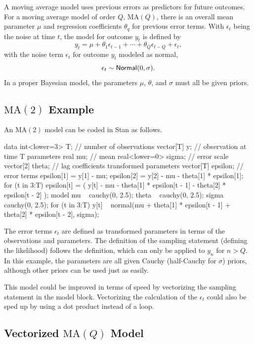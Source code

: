A moving average model uses previous errors as predictors for future
outcomes.  For a moving average model of order $Q$, $\mbox{MA}(Q)$,
there is an overall mean parameter $\mu$ and regression coefficients
$\theta_q$ for previous error terms.  With $\epsilon_t$ being the
noise at time $t$, the model for outcome $y_t$ is defined by
\[
y_t = \mu + \theta_1 \epsilon_{t-1} + \cdots + \theta_Q \epsilon_{t-Q}
+ \epsilon_t,
\]
with the noise term $\epsilon_t$ for outcome $y_t$ modeled as
normal,
\[
\epsilon_t \sim \distro{Normal}(0,\sigma).
\]
In a proper Bayesian model, the parameters $\mu$, $\theta$, and
$\sigma$ must all be given priors.

\subsection{$\mbox{MA}(2)$ Example}

An $\mbox{MA}(2)$ model can be coded in Stan as follows.
%
\begin{stancode}
data {
  int<lower=3> T;  // number of observations
  vector[T] y;     // observation at time T
}
parameters {
  real mu;              // mean
  real<lower=0> sigma;  // error scale
  vector[2] theta;      // lag coefficients
}
transformed parameters {
  vector[T] epsilon;    // error terms
  epsilon[1] = y[1] - mu;
  epsilon[2] = y[2] - mu - theta[1] * epsilon[1];
  for (t in 3:T)
    epsilon[t] = ( y[t] - mu
                    - theta[1] * epsilon[t - 1]
                    - theta[2] * epsilon[t - 2] );
}
model {
  mu ~ cauchy(0, 2.5);
  theta ~ cauchy(0, 2.5);
  sigma ~ cauchy(0, 2.5);
  for (t in 3:T)
    y[t] ~ normal(mu 
                  + theta[1] * epsilon[t - 1]
                  + theta[2] * epsilon[t - 2],
                  sigma);
}
\end{stancode}
%
The error terms $\epsilon_t$ are defined as transformed parameters in
terms of the observations and parameters.  The definition of the
sampling statement (defining the likelihood) follows the definition,
which can only be applied to $y_n$ for $n > Q$.  In this example, the
parameters are all given Cauchy (half-Cauchy for $\sigma$) priors,
although other priors can be used just as easily.

This model could be improved in terms of speed by vectorizing the
sampling statement in the model block.  Vectorizing the calculation of
the $\epsilon_t$ could also be sped up by using a dot product instead
of a loop.  


\subsection{Vectorized $\mbox{MA}(Q)$ Model}

